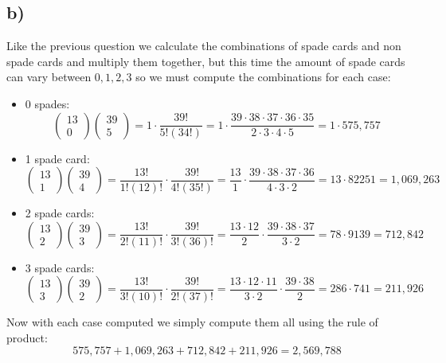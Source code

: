 \documentclass{article}
\begin{document}
\subsection*{b)}
Like the previous question we calculate the combinations of spade cards and non spade cards and multiply them together, but this time the amount of spade cards can vary between $0,1,2,3$ so we must compute the combinations for each case: 
\begin{itemize}
    \item 0 spades:$$\begin{pmatrix}
        13\\0
    \end{pmatrix}\begin{pmatrix}
        39\\5
    \end{pmatrix}=1\cdot \frac{39!}{5!(34!)}=1\cdot \frac{39\cdot 38\cdot 37\cdot 36\cdot 35}{2\cdot 3\cdot 4\cdot 5}=1\cdot 575,757$$


    \item 1 spade card:$$\begin{pmatrix}
    13\\1
    \end{pmatrix}\begin{pmatrix}
        39\\4
    \end{pmatrix}=\frac{13!}{1!(12)!}\cdot \frac{39!}{4!(35!)}=\frac{13}{1}\cdot \frac{39\cdot 38\cdot 37\cdot 36}{4\cdot 3\cdot 2}=13\cdot 82251=1,069,263$$

    \item 2 spade cards:$$\begin{pmatrix}
    13\\2
    \end{pmatrix}\begin{pmatrix}
        39\\3
    \end{pmatrix}=\frac{13!}{2!(11)!}\cdot \frac{39!}{3!(36)!}=\frac{13\cdot 12}{2}\cdot \frac{39\cdot 38\cdot 37}{3 \cdot 2}=78 \cdot 9139=712,842$$

    \item 3 spade cards:$$\begin{pmatrix}
    13\\3
    \end{pmatrix}\begin{pmatrix}
        39\\2
    \end{pmatrix}=\frac{13!}{3!(10)!}\cdot \frac{39!}{2!(37)!}=\frac{13\cdot 12\cdot 11}{3\cdot 2}\cdot \frac{39\cdot 38}{2}=286\cdot 741=211,926$$
\end{itemize}
Now with each case computed we simply compute them all using the rule of product: $$575,757+1,069,263+712,842+211,926=\boxed{2,569,788}$$
\end{document}
